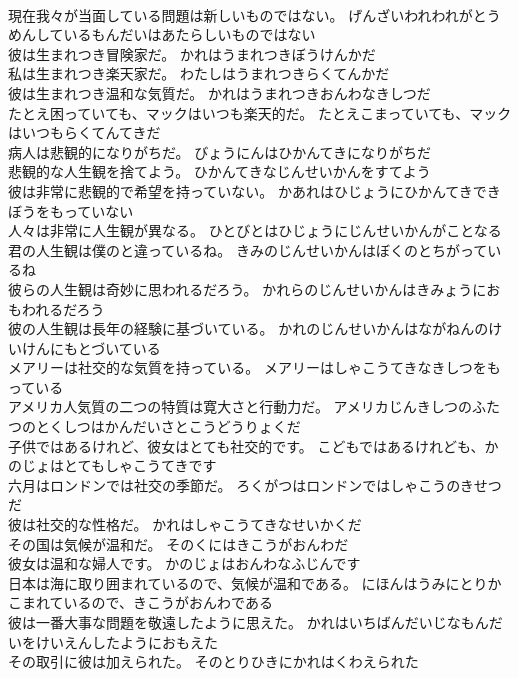 \documentclass[8pt]{extreport}
\begin{document}
\begin{CJK}{UTF8}{min}
\\	現在我々が当面している問題は新しいものではない。	げんざいわれわれがとうめんしているもんだいはあたらしいものではない 
\\	彼は生まれつき冒険家だ。	かれはうまれつきぼうけんかだ 
\\	私は生まれつき楽天家だ。	わたしはうまれつきらくてんかだ 
\\	彼は生まれつき温和な気質だ。	かれはうまれつきおんわなきしつだ 
\\	たとえ困っていても、マックはいつも楽天的だ。	たとえこまっていても、マックはいつもらくてんてきだ 
\\	病人は悲観的になりがちだ。	びょうにんはひかんてきになりがちだ 
\\	悲観的な人生観を捨てよう。	ひかんてきなじんせいかんをすてよう 
\\	彼は非常に悲観的で希望を持っていない。	かあれはひじょうにひかんてきできぼうをもっていない 
\\	人々は非常に人生観が異なる。	ひとびとはひじょうにじんせいかんがことなる 
\\	君の人生観は僕のと違っているね。	きみのじんせいかんはぼくのとちがっているね 
\\	彼らの人生観は奇妙に思われるだろう。	かれらのじんせいかんはきみょうにおもわれるだろう 
\\	彼の人生観は長年の経験に基づいている。	かれのじんせいかんはながねんのけいけんにもとづいている 
\\	メアリーは社交的な気質を持っている。	メアリーはしゃこうてきなきしつをもっている 
\\	アメリカ人気質の二つの特質は寛大さと行動力だ。	アメリカじんきしつのふたつのとくしつはかんだいさとこうどうりょくだ 
\\	子供ではあるけれど、彼女はとても社交的です。	こどもではあるけれども、かのじょはとてもしゃこうてきです 
\\	六月はロンドンでは社交の季節だ。	ろくがつはロンドンではしゃこうのきせつだ 
\\	彼は社交的な性格だ。	かれはしゃこうてきなせいかくだ 
\\	その国は気候が温和だ。	そのくにはきこうがおんわだ 
\\	彼女は温和な婦人です。	かのじょはおんわなふじんです 
\\	日本は海に取り囲まれているので、気候が温和である。	にほんはうみにとりかこまれているので、きこうがおんわである 
\\	彼は一番大事な問題を敬遠したように思えた。	かれはいちばんだいじなもんだいをけいえんしたようにおもえた 
\\	その取引に彼は加えられた。	そのとりひきにかれはくわえられた 

\end{CJK}
\end{document}
